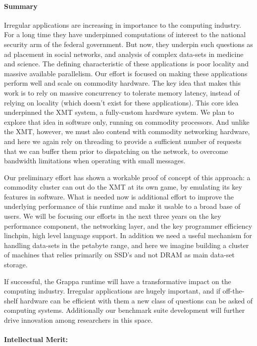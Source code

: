 \paragraph{Summary}

Irregular applications are increasing in importance to the computing industry.
For a long time they have underpinned computations of interest to the national
security arm of the federal government. But now, they underpin such questions
as ad placement in social networks, and analysis of complex data-sets in
medicine and science. The defining characteristic of these applications is
poor locality and massive available parallelism. Our effort is focused on
making these applications perform well and scale on commodity hardware. The
key idea that makes this work is to rely on massive concurrency to tolerate
memory latency, instead of relying on locality (which doesn't exist for these
applications). This core idea underpinned the XMT system, a fully-custom
hardware system. We plan to explore that idea in software only, running on
commodity processors. And unlike the XMT, however, we must also contend with
commodity networking hardware, and here we again rely on threading to provide
a sufficient number of requests that we can buffer them prior to dispatching
on the network, to overcome bandwidth limitations when operating with small
messages.

Our preliminary effort has shown a workable proof of concept of this approach: a commodity cluster can out do the XMT at its own game, by emulating its key features in software. What is needed now is additional effort to improve the underlying performance of this runtime and make it usable to a broad base of users. We will be focusing our efforts in the next three years on the key performance component, the networking layer, and the key programmer efficiency linchpin, high level language support. In addition we need a useful mechanism for handling data-sets in the petabyte range, and here we imagine building a cluster of machines that relies primarily on SSD's and not DRAM as main  data-set storage.

If successful, the Grappa runtime will have a transformative impact on the computing industry. Irregular applications are hugely important, and if off-the-shelf hardware can be efficient with them a new class of questions can be asked of computing systems. Additionally our benchmark suite development will further drive innovation among researchers in this space.

\paragraph{Intellectual Merit:}


